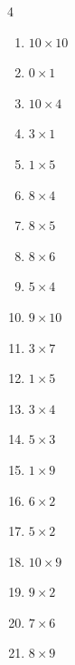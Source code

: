 \begin{multicols}{4}
\begin{enumerate}
  \item $10\times 10$
        \phantom{$=100$}

\columnbreak %

  \item $0\times 1$
        \phantom{$=0$}

  \item $10\times 4$
        \phantom{$=40$}

  \item $3\times 1$
        \phantom{$=3$}

  \item $1\times 5$
        \phantom{$=5$}

  \item $8\times 4$
        \phantom{$=32$}

  \item $8\times 5$
        \phantom{$=40$}

  \item $8\times 6$
        \phantom{$=48$}

  \item $5\times 4$
        \phantom{$=20$}

  \item $9\times 10$
        \phantom{$=90$}

  \item $3\times 7$
        \phantom{$=21$}

  \item $1\times 5$
        \phantom{$=5$}

  \item $3\times 4$
        \phantom{$=12$}

  \item $5\times 3$
        \phantom{$=15$}

  \item $1\times 9$
        \phantom{$=9$}

  \item $6\times 2$
        \phantom{$=12$}

  \item $5\times 2$
        \phantom{$=10$}

  \item $10\times 9$
        \phantom{$=90$}

  \item $9\times 2$
        \phantom{$=18$}

  \item $7\times 6$
        \phantom{$=42$}

  \item $8\times 9$
        \phantom{$=72$}


\end{enumerate}
\end{multicols}
